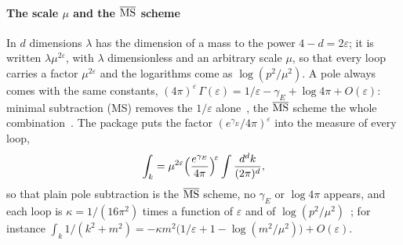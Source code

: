 \documentclass[11pt,a4paper]{article}
\begin{document}
\paragraph{The scale $\mu$ and the $\overline{\rm MS}$ scheme} In $d$ dimensions $\lambda$ has the dimension of a mass to the
power $4-d=2\varepsilon$; it is written $\lambda\mu^{2\varepsilon}$, with $\lambda$ dimensionless and an arbitrary scale
$\mu$, so that every loop carries a factor $\mu^{2\varepsilon}$ and the logarithms come as $\log(p^2/\mu^2)$. A pole always
comes with the same constants, $(4\pi)^\varepsilon\,\Gamma(\varepsilon)=1/\varepsilon-\gamma_E+\log4\pi+O(\varepsilon)$:
minimal subtraction (MS) removes the $1/\varepsilon$ alone~\cite{tHooft1973}, the $\overline{\rm MS}$ scheme the whole
combination~\cite{BardeenBurasDukeMuta1978}. The package puts the factor $(e^{\gamma_E}/4\pi)^\varepsilon$ into the measure
of every loop,
\[
\int_k=\mu^{2\varepsilon}\Bigl(\frac{e^{\gamma_E}}{4\pi}\Bigr)^{\!\varepsilon}\int\frac{d^dk}{(2\pi)^d},
\]
so that plain pole subtraction is the $\overline{\rm MS}$ scheme, no $\gamma_E$ or $\log4\pi$ appears, and each loop is
$\kappa=1/(16\pi^2)$ times a function of $\varepsilon$ and of
$\log(p^2/\mu^2)$~\cite{ItzyksonZuber,PeskinSchroeder,ZinnJustin2002,KleinertSchulteFrohlinde2001}; for instance
$\int_k1/(k^2+m^2)=-\kappa m^2\bigl(1/\varepsilon+1-\log(m^2/\mu^2)\bigr)+O(\varepsilon)$.
\end{document}
